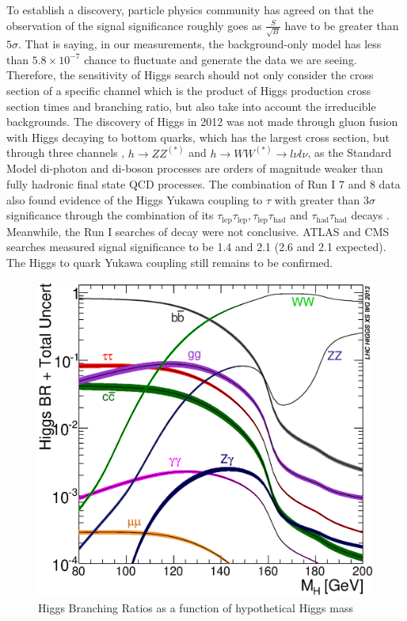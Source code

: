To establish a discovery, particle physics community has agreed on that the observation of the signal significance roughly goes as $\frac{S}{\sqrt{B}}$ have to be greater than $5\sigma$. That is saying, in our measurements, the background-only model has less than $5.8\times 10^{-7}$ chance to fluctuate and generate the data we are seeing. Therefore, the sensitivity of Higgs search should not only consider the cross section of a specific channel which is the product of Higgs production cross section times and branching ratio, but also take into account the irreducible backgrounds. The discovery of Higgs in 2012 was not made through gluon fusion with Higgs decaying to bottom quarks, which has the largest cross section, but through three channels \Hgammagamma, $h\rightarrow ZZ^{(*)}$ and $h\rightarrow WW^{(*)}\rightarrow l\nu l\nu$\cite{HIGG-2012-27,CMS-HIG-12-028}, as the Standard Model di-photon and di-boson processes are orders of magnitude weaker than fully hadronic final state QCD processes. The combination of Run I 7 and 8 \tev data also found evidence of the Higgs Yukawa coupling to $\tau$ with greater than $3\sigma$ significance through the combination of its $\tau_{\text{lep}}\tau_{\text{lep}},\tau_{\text{lep}}\tau_{\text{had}}$ and $\tau_{\text{had}}\tau_{\text{had}}$ decays \cite{HIGG-2013-32,CMS-HIG-13-004}. Meanwhile, the Run I searches of \Hbb decay were not conclusive. ATLAS and CMS searches measured signal significance to be 1.4 and 2.1 (2.6 and 2.1 expected)\cite{HIGG-2013-23,CMS-HIG-13-012}. The Higgs to quark Yukawa coupling still remains to be confirmed. 

\begin{figure}[htpb!]
\begin{center}
  \includegraphics[width=0.45\linewidth]{figures/theory/Higgs_BR_LM.eps}
\caption{Higgs Branching Ratios as a function of hypothetical Higgs mass}
\label{fig:theory-higgsbr}
\end{center}
\end{figure}


